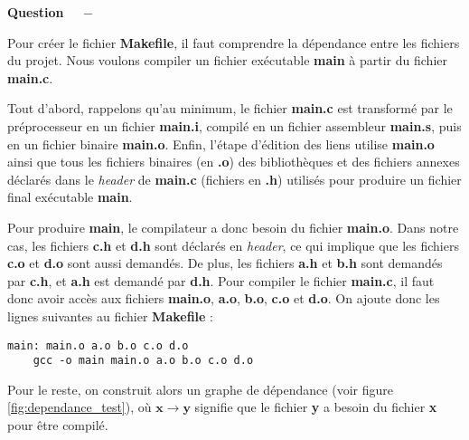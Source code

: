 \documentclass[11pt]{article}
\newcounter{question}[section]
\newenvironment{question}[1][]{\refstepcounter{question}\par\medskip
   \noindent\textbf{Question~\thequestion ~ $-$} \rmfamily}{}
\begin{document}
\begin{question} %

Pour créer le fichier \textbf{Makefile}, il faut comprendre la dépendance entre les fichiers du projet.
Nous voulons compiler un fichier exécutable \textbf{main} à partir du fichier \textbf{main.c}.

Tout d'abord, rappelons qu'au minimum, le fichier \textbf{main.c} est transformé par le préprocesseur en un fichier \textbf{main.i}, compilé en un fichier assembleur \textbf{main.s}, puis en un fichier binaire \textbf{main.o}. Enfin, l'étape d'édition des liens utilise \textbf{main.o} ainsi que tous les fichiers binaires (en \textbf{.o}) des bibliothèques et des fichiers annexes déclarés dans le \textit{header} de \textbf{main.c} (fichiers en \textbf{.h}) utilisés pour produire un fichier final exécutable \textbf{main}.


Pour produire \textbf{main}, le compilateur a donc besoin du fichier \textbf{main.o}. Dans notre cas, les fichiers \textbf{c.h} et \textbf{d.h} sont déclarés en \textit{header}, ce qui implique que les fichiers \textbf{c.o} et \textbf{d.o} sont aussi demandés. De plus, les fichiers \textbf{a.h} et \textbf{b.h} sont demandés par \textbf{c.h}, et \textbf{a.h} est demandé par \textbf{d.h}. Pour compiler le fichier \textbf{main.c}, il faut donc avoir accès aux fichiers \textbf{main.o}, \textbf{a.o}, \textbf{b.o}, \textbf{c.o} et \textbf{d.o}.
On ajoute donc les lignes suivantes au fichier \textbf{Makefile} :
\begin{verbatim}
main: main.o a.o b.o c.o d.o
    gcc -o main main.o a.o b.o c.o d.o
\end{verbatim}

Pour le reste, on construit alors un graphe de dépendance (voir figure \ref{fig:dependance_test}), où $\mathbf{x}\rightarrow \mathbf{y}$ signifie que le fichier \textbf{y} a besoin du fichier \textbf{x} pour être compilé.



\end{question}
\end{document}
